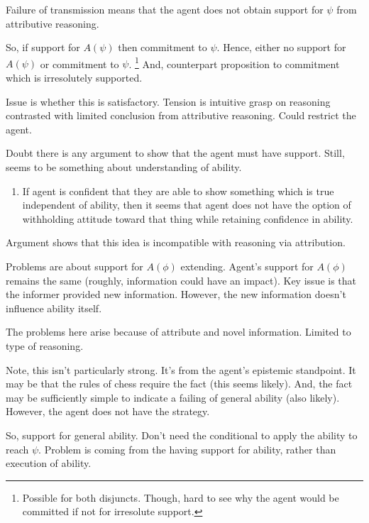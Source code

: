 \documentclass[10pt]{article}
\begin{document}
\begin{note}
  Failure of transmission means that the agent does not obtain support for \(\psi\) from attributive reasoning.

  So, if support for \(A(\psi)\) then commitment to \(\psi\).
  Hence, either no support for \(A(\psi)\) or commitment to \(\psi\).\nolinebreak
  \footnote{
    Possible for both disjuncts.
    Though, hard to see why the agent would be committed if not for irresolute support.
  }
  And, counterpart proposition to commitment which is irresolutely supported.

  Issue is whether this is satisfactory.
  Tension is intuitive grasp on reasoning contrasted with limited conclusion from attributive reasoning.
  Could restrict the agent.

  Doubt there is any argument to show that the agent must have support.
  Still, seems to be something about understanding of ability.

  \begin{enumerate}
  \item\label{intuition:attitude-to-fact-from-ability-to-demonstrate} If agent is confident that they are able to show something which is true independent of ability, then it seems that agent does not have the option of withholding attitude toward that thing while retaining confidence in ability.
  \end{enumerate}

  Argument shows that this idea is incompatible with reasoning via attribution.

  Problems are about support for \(A(\phi)\) extending.
  Agent's support for \(A(\phi)\) remains the same (roughly, information could have an impact).
  Key issue is that the informer provided new information.
  However, the new information doesn't influence ability itself.

  The problems here arise because of attribute and novel information.
  Limited to type of reasoning.

  Note, this isn't particularly strong.
  It's from the agent's epistemic standpoint.
  It may be that the rules of chess require the fact (this seems likely).
  And, the fact may be sufficiently simple to indicate a failing of general ability (also likely).
  However, the agent does not have the strategy.

  So, support for general ability.
  Don't need the conditional to apply the ability to reach \(\psi\).
  Problem is coming from the having support for ability, rather than execution of ability.


\end{note}
\end{document}
